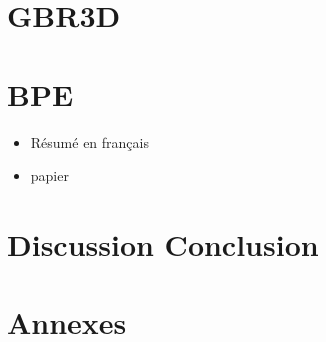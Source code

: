 \documentclass[a4paper,12pt,notitlepage]{report}
\numberwithin{equation}{section}
\begin{document}

\chapter{GBR3D}








\chapter{BPE}
\begin{itemize}
\item Résumé en français
\item papier
\end{itemize}

\chapter*{Discussion Conclusion}

\chapter*{Annexes}


\listoffigures

\listoftables




\end{document}
